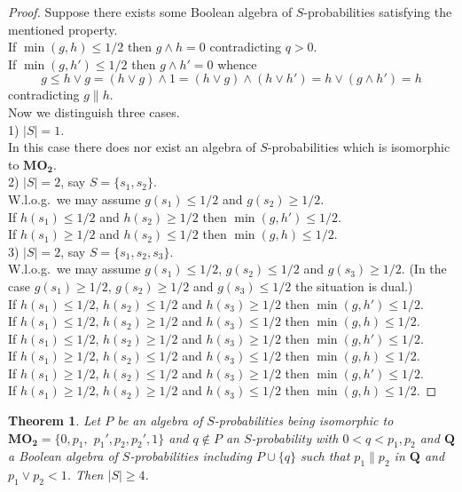 \documentclass[12pt]{article}
\newtheorem{theorem}{Theorem}[section]
\begin{document}
\begin{proof}
Suppose there exists some Boolean algebra of $S$-probabilities satisfying the mentioned property. \\
If $\min(g,h)\le1/2$ then $g\wedge h=0$ contradicting $q>0$. \\
If $\min(g,h')\le1/2$ then $g\wedge h'=0$ whence
\[
g\le h\vee g=(h\vee g)\wedge1=(h\vee g)\wedge(h\vee h')=h\vee(g\wedge h')=h
\]
contradicting $g\parallel h$. \\
Now we distinguish three cases. \\
1) $|S|=1$. \\
In this case there does nor exist an algebra of $S$-probabilities which is isomorphic to $\mathbf{MO_2}$. \\
2) $|S|=2$, say $S=\{s_1,s_2\}$. \\
W.l.o.g.\ we may assume $g(s_1)\le1/2$ and $g(s_2)\ge1/2$. \\
If $h(s_1)\le1/2$ and $h(s_2)\ge1/2$ then $\min(g,h')\le1/2$. \\
If $h(s_1)\ge1/2$ and $h(s_2)\le1/2$ then $\min(g,h)\le1/2$. \\
3) $|S|=2$, say $S=\{s_1,s_2,s_3\}$. \\
W.l.o.g.\ we may assume $g(s_1)\le1/2$, $g(s_2)\le1/2$ and $g(s_3)\ge1/2$. (In the case $g(s_1)\ge1/2$, $g(s_2)\ge1/2$ and $g(s_3)\le1/2$ the situation is dual.) \\
If $h(s_1)\le1/2$, $h(s_2)\le1/2$ and $h(s_3)\ge1/2$ then $\min(g,h')\le1/2$. \\
If $h(s_1)\le1/2$, $h(s_2)\ge1/2$ and $h(s_3)\le1/2$ then $\min(g,h)\le1/2$. \\
If $h(s_1)\le1/2$, $h(s_2)\ge1/2$ and $h(s_3)\ge1/2$ then $\min(g,h')\le1/2$. \\
If $h(s_1)\ge1/2$, $h(s_2)\le1/2$ and $h(s_3)\le1/2$ then $\min(g,h)\le1/2$. \\
If $h(s_1)\ge1/2$, $h(s_2)\le1/2$ and $h(s_3)\ge1/2$ then $\min(g,h')\le1/2$. \\
If $h(s_1)\ge1/2$, $h(s_2)\ge1/2$ and $h(s_3)\le1/2$ then $\min(g,h)\le1/2$.
\end{proof}

\begin{theorem}\label{th6}
Let $P$ be an algebra of $S$-probabilities being isomorphic to $\mathbf{MO_2}=\{0,p_1,$ $p_1',p_2,p_2',1\}$ and $q\notin P$ an $S$-probability with $0<q<p_1,p_2$ and $\mathbf Q$ a Boolean algebra of $S$-probabilities including $P\cup\{q\}$ such that $p_1\parallel p_2$ in $\mathbf Q$ and $p_1\vee p_2<1$. Then $|S|\ge4$.
\end{theorem}
\end{document}
